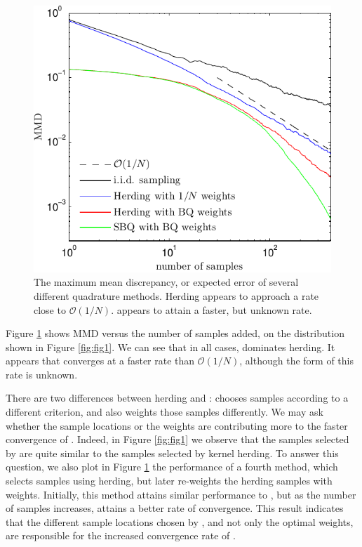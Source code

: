 \begin{figure}
\includegraphics[width=\columnwidth]{figs/herding/expected_variance_v7_400}
\caption[Discrepancy of Bayesian quadrature, herding and random sampling]{The maximum mean discrepancy, or expected error of several different quadrature methods. Herding appears to approach a rate close to $\mathcal{O}(1/N)$. \sbq{} appears to attain a faster, but unknown rate.}
\label{fig:mmd_curve}
\end{figure}

Figure \ref{fig:mmd_curve} shows MMD versus the number of samples added, on the distribution shown in Figure \ref{fig:fig1}. We can see that in all cases, \sbq{} dominates herding. It appears that \sbq{} converges at a faster rate than $\mathcal{O}(1/N)$, although the form of this rate is unknown.

There are two differences between herding and \sbq{}:  \sbq{} chooses samples according to a different criterion, and also weights those samples differently. We may ask whether the sample locations or the weights are contributing more to the faster convergence of \sbq{}. Indeed, in Figure \ref{fig:fig1} we observe that the samples selected by \sbq{} are quite similar to the samples selected by kernel herding. To answer this question, we also plot in Figure \ref{fig:mmd_curve} the performance of a fourth method, which selects samples using herding, but later re-weights the herding samples with \bq{} weights. Initially, this method attains similar performance to \sbq{}, but as the number of samples increases, \sbq{} attains a better rate of convergence. This result indicates that the different sample locations chosen by \sbq{}, and not only the optimal weights, are responsible for the increased convergence rate of \sbq{}.

